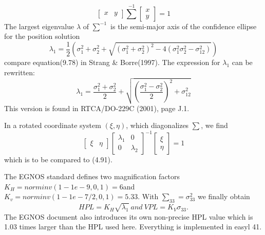		\begin{equation*}
			\begin{bmatrix}
				x & y
			\end{bmatrix}\sum^{-1}
			\begin{bmatrix}
				x \\ y
			\end{bmatrix}
			= 1
		\end{equation*}
		The largest eigenvalue $\lambda$ of $\sum^{-1}$ is the semi-major axis of the confidence ellipse for the position solution
		\begin{equation*}
			\lambda_1 = \dfrac{1}{2}\left(\sigma^2_1 + \sigma^2_2 + \sqrt{(\sigma^2_1 + \sigma^2_2)^2 - 4(\sigma^2_1\sigma^2_2 - \sigma^2_{12})} \right)
		\end{equation*}
		compare equation(9.78) in Strang \& Borre(1997). The expression for $\lambda_1$ can be rewritten:
		\begin{equation}\label{9.74}
			\lambda_1 = \dfrac{\sigma^2_1 + \sigma^2_2}{2} + \sqrt{(\dfrac{\sigma^2_1 - \sigma^2_2}{2})^2 + \sigma^2_{12}}
		\end{equation}
		This version is found in RTCA/DO-229C (2001), page J.1.
		
		In a rotated coordinate system $(\xi,\eta)$, which diagonalizes $\sum$, we find
		\begin{equation}\label{9.75}
			\begin{bmatrix}
				\xi & \eta
			\end{bmatrix}
			\begin{bmatrix}
				\lambda_1 & 0 \\
				0 & \lambda_2
			\end{bmatrix}^{-1}
			\begin{bmatrix}
				\xi \\ \eta
			\end{bmatrix} = 1
		\end{equation}
		which is to be compared to (4.91).
		
		The EGNOS standard defines two magnification factors $K_H = norminv(1-1e-9,0,1)=6 $and$K_v = norminv(1-1e-7/2,0,1) = 5.33$. With $\sum_{33} = \sigma^2_{33}$ we finally obtain
		\begin{equation*}
			HPL = K_H\sqrt{\lambda_1}\: and \:VPL = K_V\sigma_{33}.
		\end{equation*}
		The EGNOS document also introduces its own non-precise HPL value which is 1.03 times larger than the HPL used here. Everything is implemented in easyl 41.
		
